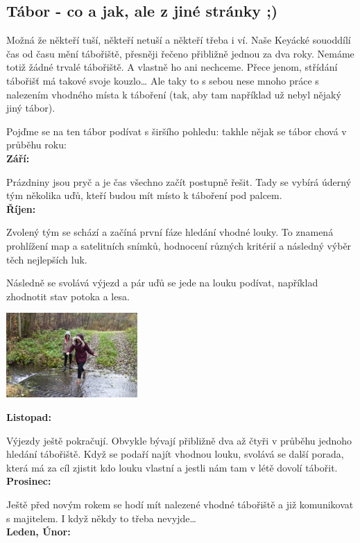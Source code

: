 \subsection*{Tábor - co a jak, ale z jiné stránky ;)} %
\label{ssub:tábor_co_a_jak}


Možná že někteří tuší, někteří netuší a někteří třeba i ví. Naše Keyácké souoddílí čas od času mění tábořiště, přesněji řečeno přibližně jednou za dva roky. Nemáme totiž žádné trvalé tábořiště. A vlastně ho ani nechceme.
Přece jenom, střídání tábořišť má takové svoje kouzlo… 
Ale taky to s sebou nese mnoho práce s nalezením vhodného místa k táboření (tak, aby tam například už nebyl nějaký jiný tábor).

Pojďme se na ten tábor podívat s širšího pohledu: takhle nějak se tábor chová v průběhu roku: \\
\textbf{Září:}

Prázdniny jsou pryč a je čas všechno začít postupně řešit. Tady se vybírá úderný tým několika uďů, kteří budou mít místo k táboření pod palcem.\\
\textbf{Říjen:}

Zvolený tým se schází a začíná první fáze hledání vhodné louky. To znamená prohlížení map a satelitních snímků, hodnocení různých kritérií a následný výběr těch nejlepších luk.

Následně se svolává výjezd a pár uďů se jede na louku podívat, například zhodnotit stav potoka a lesa.\\
\begin{center}
\includegraphics[width=5cm]{img/udo_clanky/hledani_brod.jpg}
\end{center}
\textbf{Listopad:}

Výjezdy ještě pokračují. Obvykle bývají přibližně dva až čtyři v průběhu jednoho hledání tábořiště.
Když se podaří najít vhodnou louku, svolává se další porada, která má za cíl zjistit kdo louku vlastní a jestli nám tam v létě dovolí tábořit.
\textbf{Prosinec:}

Ještě před novým rokem se hodí mít nalezené vhodné tábořiště a již komunikovat s majitelem. I když někdy to třeba nevyjde…\\
\textbf{Leden, Únor:}

